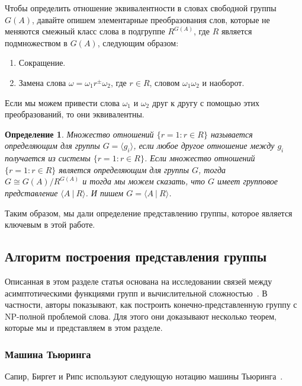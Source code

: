 \documentclass[14pt]{matmex-diploma-custom}
\newtheorem{defn}{Определение}[subsection]
\begin{document}
Чтобы определить отношение эквивалентности в словах свободной группы $G(A)$, давайте опишем элементарные преобразования слов, которые не меняются
смежный класс слова в подгруппе $ R^{G (A)} $, где $ R $ является подмножеством в $ G (A) $, следующим образом:
\begin{enumerate}
\item Сокращение.
\item Замена слова $\omega = \omega_1 r^{\pm} \omega_2$, где $r \in R$, словом $\omega_1 \omega_2$ и наоборот.
\end{enumerate}

Если мы можем привести слова $ \omega_1 $ и $ \omega_2 $ друг к
другу с помощью этих преобразований, то они эквивалентны.

\begin{defn}
Множество отношений $ \{r = 1: r \in R \} $ называется определяющим для группы
$ G = \langle g_i \rangle $, если любое другое отношение между
$ g_i $ получается из системы $ \{r = 1: r \in R \} $. Если множество отношений
$ \{r = 1: r \in R \} $ является определяющим для группы $ G $, тогда $ G \cong G (A)/R^{G (A)} $
и тогда мы можем сказать, что $ G $ имеет групповое представление $ \langle A ~|~ R \rangle $.
И пишем $G = \langle A ~|~ R \rangle $.
\end{defn}

Таким образом, мы дали определение представлению группы, которое является ключевым в этой работе. 

\subsection{Алгоритм построения представления группы}

Описанная в этом разделе статья основана на исследовании связей
между асимптотическими функциями групп и вычислительной сложностью~\cite{Sapir}.
В частности, авторы показывают, как построить конечно-представленную группу
с NP-полной проблемой слова. Для этого они доказывают несколько теорем,
которые мы и представляем в этом разделе.

\subsubsection{Машина Тьюринга}

Сапир, Биргет и Рипс используют следующую нотацию машины Тьюринга~\cite{Sapir}.
\end{document}
